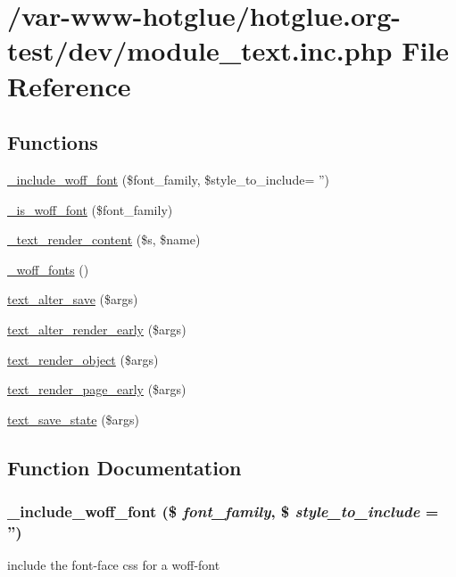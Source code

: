 \hypertarget{module__text_8inc_8php}{
\section{/var-\/www-\/hotglue/hotglue.org-\/test/dev/module\_\-text.inc.php File Reference}
\label{module__text_8inc_8php}
}
\subsection*{Functions}
\begin{DoxyCompactItemize}
\item 
\hyperlink{module__text_8inc_8php_a1cee3a7df743730d3e13919dede62d85}{\_\-include\_\-woff\_\-font} (\$font\_\-family, \$style\_\-to\_\-include= '')
\item 
\hyperlink{module__text_8inc_8php_a270432cf0918807ddfc6b698539d02e3}{\_\-is\_\-woff\_\-font} (\$font\_\-family)
\item 
\hyperlink{module__text_8inc_8php_a0586b5e177a15f5904d49b8b3aaf19ee}{\_\-text\_\-render\_\-content} (\$s, \$name)
\item 
\hyperlink{module__text_8inc_8php_a579e502fadfb1146d8470c8f409916fd}{\_\-woff\_\-fonts} ()
\item 
\hyperlink{module__text_8inc_8php_aaee0a89ba2b213f761b05ca2d6460910}{text\_\-alter\_\-save} (\$args)
\item 
\hyperlink{module__text_8inc_8php_ac57835ba072c7df9367b2c277d2f5bd7}{text\_\-alter\_\-render\_\-early} (\$args)
\item 
\hyperlink{module__text_8inc_8php_a8e9b1db22ff6cb0f3d20815da6aae6ce}{text\_\-render\_\-object} (\$args)
\item 
\hyperlink{module__text_8inc_8php_aaaa8b8407d795f6dba9d258f1457ade8}{text\_\-render\_\-page\_\-early} (\$args)
\item 
\hyperlink{module__text_8inc_8php_a7fa0ea2ee517914595d7eda355177289}{text\_\-save\_\-state} (\$args)
\end{DoxyCompactItemize}


\subsection{Function Documentation}
\hypertarget{module__text_8inc_8php_a1cee3a7df743730d3e13919dede62d85}{
\subsubsection[{\_\-include\_\-woff\_\-font}]{\setlength{\rightskip}{0pt plus 5cm}\_\-include\_\-woff\_\-font (\$ {\em font\_\-family}, \/  \$ {\em style\_\-to\_\-include} = {\ttfamily ''})}}
\label{module__text_8inc_8php_a1cee3a7df743730d3e13919dede62d85}
include the font-\/face css for a woff-\/font



